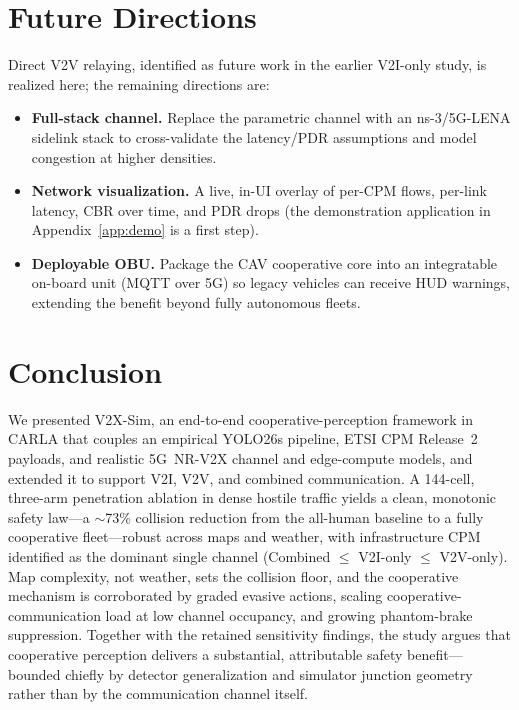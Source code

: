 \documentclass[11pt]{article}
\begin{document}
\section{Future Directions}
Direct V2V relaying, identified as future work in the earlier V2I-only study, is
realized here; the remaining directions are:
\begin{itemize}[leftmargin=1.3em,itemsep=0.15em,topsep=0.2em]
  \item \textbf{Full-stack channel.} Replace the parametric channel with an
  ns-3/5G-LENA sidelink stack to cross-validate the latency/PDR assumptions and
  model congestion at higher densities.
  \item \textbf{Network visualization.} A live, in-UI overlay of per-CPM flows,
  per-link latency, CBR over time, and PDR drops (the demonstration application in
  Appendix~\ref{app:demo} is a first step).
  \item \textbf{Deployable OBU.} Package the CAV cooperative core into an
  integratable on-board unit (MQTT over 5G) so legacy vehicles can receive HUD
  warnings, extending the benefit beyond fully autonomous fleets.
\end{itemize}

\section{Conclusion}
We presented V2X-Sim, an end-to-end cooperative-perception framework in CARLA that
couples an empirical YOLO26s pipeline, ETSI CPM Release~2 payloads, and realistic
5G~NR-V2X channel and edge-compute models, and extended it to support V2I, V2V, and
combined communication. A 144-cell, three-arm penetration ablation in dense hostile
traffic yields a clean, monotonic safety law---a $\sim$73\% collision reduction from
the all-human baseline to a fully cooperative fleet---robust across maps and
weather, with infrastructure CPM identified as the dominant single channel
(Combined $\leq$ V2I-only $\leq$ V2V-only). Map complexity, not weather, sets the
collision floor, and the cooperative mechanism is corroborated by graded evasive
actions, scaling cooperative-communication load at low channel occupancy, and
growing phantom-brake suppression. Together with the retained sensitivity findings,
the study argues that cooperative perception delivers a substantial, attributable
safety benefit---bounded chiefly by detector generalization and simulator junction
geometry rather than by the communication channel itself.
\end{document}
